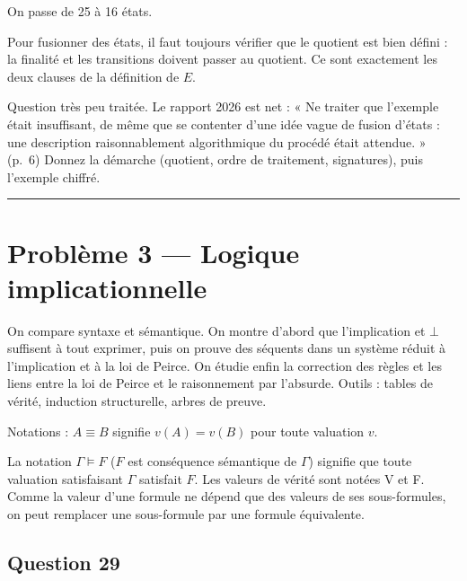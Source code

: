 \documentclass[11pt,a4paper]{article}
\begin{document}
On passe de 25 à 16 états.

\begin{methode}

Pour fusionner des états, il faut toujours vérifier que le quotient est bien défini : la finalité et les transitions doivent passer au quotient. Ce sont exactement les deux clauses de la définition de \(E\).

\end{methode}

\begin{jury}

Question très peu traitée. Le rapport 2026 est net : « Ne traiter que l'exemple était insuffisant, de même que se contenter d'une idée vague de fusion d'états : une description raisonnablement algorithmique du procédé était attendue. » (p.~6) Donnez la démarche (quotient, ordre de traitement, signatures), puis l'exemple chiffré.

\end{jury}

\begin{center}\rule{0.5\linewidth}{0.5pt}\end{center}

\hypertarget{probluxe8me-3-logique-implicationnelle}{%
\section{Problème 3 --- Logique implicationnelle}\label{probluxe8me-3-logique-implicationnelle}}

On compare syntaxe et sémantique. On montre d'abord que l'implication et \(\bot\) suffisent à tout exprimer, puis on prouve des séquents dans un système réduit à l'implication et à la loi de Peirce. On étudie enfin la correction des règles et les liens entre la loi de Peirce et le raisonnement par l'absurde. Outils : tables de vérité, induction structurelle, arbres de preuve.

Notations : \(A \equiv B\) signifie \(v(A) = v(B)\) pour toute valuation \(v\).

La notation \(\Gamma \models F\) (\(F\) est conséquence sémantique de \(\Gamma\)) signifie que toute valuation satisfaisant \(\Gamma\) satisfait \(F\). Les valeurs de vérité sont notées V et F. Comme la valeur d'une formule ne dépend que des valeurs de ses sous-formules, on peut remplacer une sous-formule par une formule équivalente.

\hypertarget{question-29}{%
\subsection{Question 29}\label{question-29}}
\end{document}
